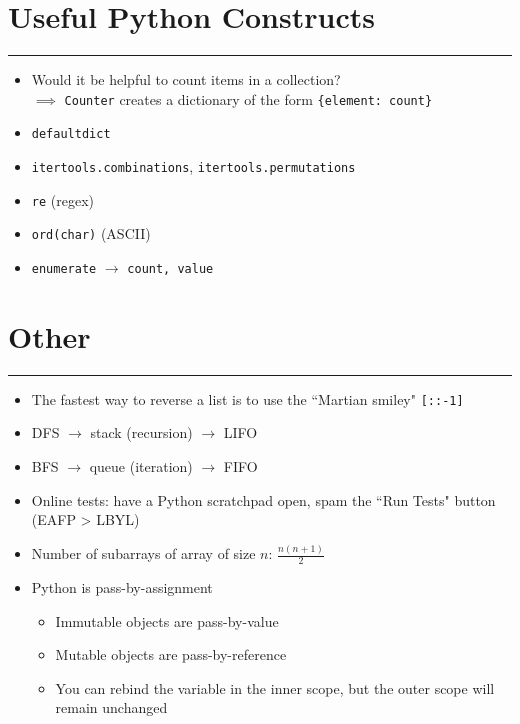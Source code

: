 \documentclass[12pt]{article}
\begin{document}
\section*{Useful Python Constructs}
\hrule\vspace{5ex}

\begin{itemize}
  \item Would it be helpful to count items in a collection? \\
    \-\hspace{1em} $\implies$ \texttt{Counter} creates a dictionary of the form \texttt{\{element: count\}}
  \item \texttt{defaultdict}
  \item \texttt{itertools.combinations}, \texttt{itertools.permutations}
  \item \texttt{re} (regex)
  \item \texttt{ord(char)} (ASCII)
  \item \texttt{enumerate} $\rightarrow$ \texttt{count, value}
\end{itemize}

\section*{Other}
\hrule\vspace{5ex}

\begin{itemize}
  \item The fastest way to reverse a list is to use the ``Martian smiley" \texttt{[::-1]}
  \item DFS $\rightarrow$ stack (recursion) $\rightarrow$ LIFO
  \item BFS $\rightarrow$ queue (iteration) $\rightarrow$ FIFO
  \item Online tests: have a Python scratchpad open, spam the ``Run Tests" button (EAFP > LBYL)
  \item Number of subarrays of array of size $n$: $\frac{n(n+1)}{2}$
  \item Python is pass-by-assignment
  \begin{itemize}
    \item Immutable objects are pass-by-value
    \item Mutable objects are pass-by-reference
    \item You can rebind the variable in the inner scope, but the outer scope will remain unchanged
  \end{itemize}
\end{itemize}
\end{document}
